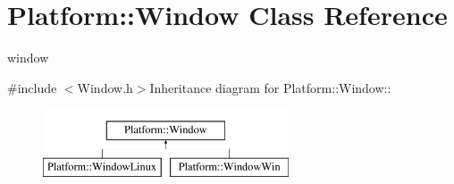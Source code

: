 \hypertarget{classPlatform_1_1Window}{
\section{Platform::Window Class Reference}
\label{classPlatform_1_1Window}
}


window  


{\ttfamily \#include $<$Window.h$>$}Inheritance diagram for Platform::Window::\begin{figure}[H]
\begin{center}
\leavevmode
\includegraphics[height=2cm]{classPlatform_1_1Window}
\end{center}
\end{figure}
